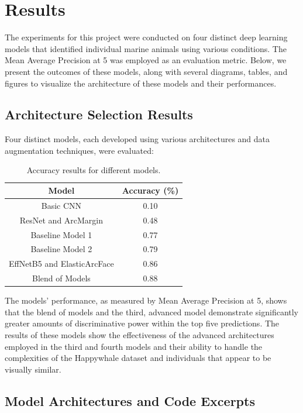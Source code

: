 \documentclass[twocolumn]{article}
\begin{document}
\section{Results}

The experiments for this project were conducted on four distinct deep learning models that identified individual marine animals using various conditions. The Mean Average Precision at 5 was employed as an evaluation metric. Below, we present the outcomes of these models, along with several diagrams, tables, and figures to visualize the architecture of these models and their performances.

\subsection{Architecture Selection Results}



Four distinct models, each developed using various architectures and data augmentation techniques, were evaluated:

\begin{table}[ht!]
\centering
\begin{tabular}{|c|c|}
\hline
\textbf{Model} & \textbf{Accuracy (\%)} \\ 
\hline
Basic CNN & 0.10 \\ 
\hline
ResNet and ArcMargin & 0.48 \\ 
\hline
Baseline Model 1 & 0.77 \\
\hline
Baseline Model 2 & 0.79 \\
\hline
EffNetB5 and ElasticArcFace & 0.86 \\ 
\hline
Blend of Models & 0.88 \\ 
\hline
\end{tabular}
\caption{Accuracy results for different models.}
\label{tab:model_accuracy}
\end{table}

The models’ performance, as measured by Mean Average Precision at 5, shows that the blend of models and the third, advanced model demonstrate significantly greater amounts of discriminative power within the top five predictions. The results of these models show the effectiveness of the advanced architectures employed in the third and fourth models and their ability to handle the complexities of the Happywhale dataset and individuals that appear to be visually similar.

\subsection{Model Architectures and Code Excerpts}
\end{document}
